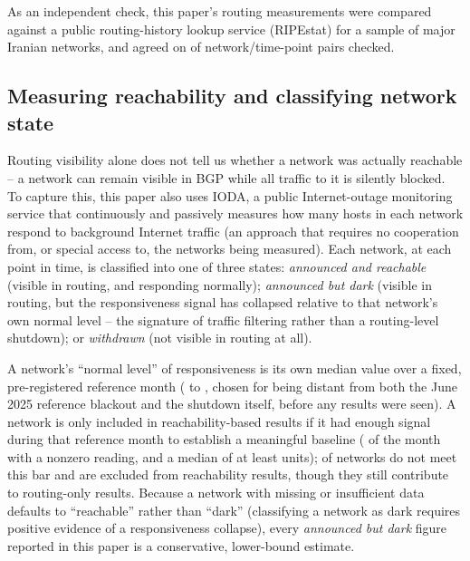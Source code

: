 As an independent check, this paper's routing measurements were compared
against a public routing-history lookup service (RIPEstat) for a sample of
major Iranian networks, and agreed on \ripestatAgreeN{} of \ripestatN{}
network/time-point pairs checked.

\subsection{Measuring reachability and classifying network state}
\label{sec:state-derivation}

Routing visibility alone does not tell us whether a network was actually
reachable -- a network can remain visible in BGP while all traffic to it is
silently blocked. To capture this, this paper also uses IODA, a public
Internet-outage monitoring service that continuously and passively
measures how many hosts in each network respond to background Internet
traffic (an approach that requires no cooperation from, or special access
to, the networks being measured). Each network, at each point in time, is
classified into one of three states: \emph{announced and reachable}
(visible in routing, and responding normally); \emph{announced but dark}
(visible in routing, but the responsiveness signal has collapsed relative
to that network's own normal level -- the signature of traffic filtering
rather than a routing-level shutdown); or \emph{withdrawn} (not visible in
routing at all).

A network's ``normal level'' of responsiveness is its own median value over
a fixed, pre-registered reference month (\probingBaselineStart{} to
\probingBaselineEnd{}, chosen for being distant from both the June 2025
reference blackout and the shutdown itself, before any results were seen).
A network is only included in reachability-based results if it had enough
signal during that reference month to establish a meaningful baseline
(\probingAdequacyMinNonzeroShare{} of the month with a nonzero reading, and
a median of at least \probingAdequacyMinMedian{} units); \nProbingExcluded{}
of \nIrAsns{} networks do not meet this bar and are excluded from
reachability results, though they still contribute to routing-only
results. Because a network with missing or insufficient data defaults to
``reachable'' rather than ``dark'' (classifying a network as dark requires
positive evidence of a responsiveness collapse), every \emph{announced but
dark} figure reported in this paper is a conservative, lower-bound
estimate.

